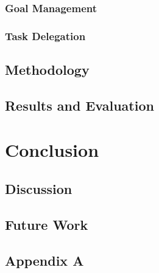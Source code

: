 \documentclass[12pt]{report}
\begin{document}
\subsection{Goal Management}

\subsection{Task Delegation}

\section{Methodology}

\section{Results and Evaluation}

\chapter{Conclusion}
\label{ch:conclusion}

\section{Discussion}

\section{Future Work}

\pagebreak





\begin{appendices}
\chapter*{Appendix A}
\label{apdx:constraints}

\end{appendices}
\end{document}

